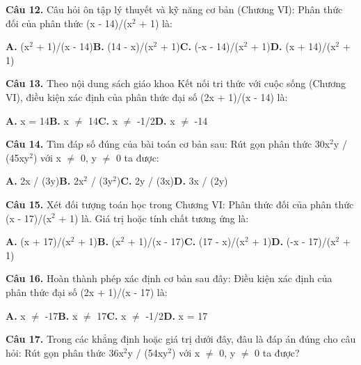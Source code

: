 \documentclass[11pt,a4paper]{article}
\begin{document}
\textbf{\color{primary} Câu 12.} Câu hỏi ôn tập lý thuyết và kỹ năng cơ bản (Chương VI): Phân thức đối của phân thức (x - 14)/(x$^2$ + 1) là:\par
\hspace*{1.5em}\textbf{A.} (x$^2$ + 1)/(x - 14)\quad\quad \textbf{B.} (14 - x)/(x$^2$ + 1)\quad\quad \textbf{C.} (-x - 14)/(x$^2$ + 1)\quad\quad \textbf{D.} (x + 14)/(x$^2$ + 1)\par\vspace{2pt}
\textbf{\color{primary} Câu 13.} Theo nội dung sách giáo khoa Kết nối tri thức với cuộc sống (Chương VI), điều kiện xác định của phân thức đại số (2x + 1)/(x - 14) là:\par
\hspace*{1.5em}\textbf{A.} x = 14\quad\quad \textbf{B.} x $\ne$ 14\quad\quad \textbf{C.} x $\ne$ -1/2\quad\quad \textbf{D.} x $\ne$ -14\par\vspace{2pt}
\textbf{\color{primary} Câu 14.} Tìm đáp số đúng của bài toán cơ bản sau: Rút gọn phân thức 30x$^2$y / (45xy$^2$) với x $\ne$ 0, y $\ne$ 0 ta được:\par
\hspace*{1.5em}\textbf{A.} 2x / (3y)\quad\quad \textbf{B.} 2x$^2$ / (3y$^2$)\quad\quad \textbf{C.} 2y / (3x)\quad\quad \textbf{D.} 3x / (2y)\par\vspace{2pt}
\textbf{\color{primary} Câu 15.} Xét đối tượng toán học trong Chương VI: Phân thức đối của phân thức (x - 17)/(x$^2$ + 1) là. Giá trị hoặc tính chất tương ứng là:\par
\hspace*{1.5em}\textbf{A.} (x + 17)/(x$^2$ + 1)\quad\quad \textbf{B.} (x$^2$ + 1)/(x - 17)\quad\quad \textbf{C.} (17 - x)/(x$^2$ + 1)\quad\quad \textbf{D.} (-x - 17)/(x$^2$ + 1)\par\vspace{2pt}
\textbf{\color{primary} Câu 16.} Hoàn thành phép xác định cơ bản sau đây: Điều kiện xác định của phân thức đại số (2x + 1)/(x - 17) là:\par
\hspace*{1.5em}\textbf{A.} x $\ne$ -17\quad\quad \textbf{B.} x $\ne$ 17\quad\quad \textbf{C.} x $\ne$ -1/2\quad\quad \textbf{D.} x = 17\par\vspace{2pt}
\textbf{\color{primary} Câu 17.} Trong các khẳng định hoặc giá trị dưới đây, đâu là đáp án đúng cho câu hỏi: Rút gọn phân thức 36x$^2$y / (54xy$^2$) với x $\ne$ 0, y $\ne$ 0 ta được?\par
\end{document}
